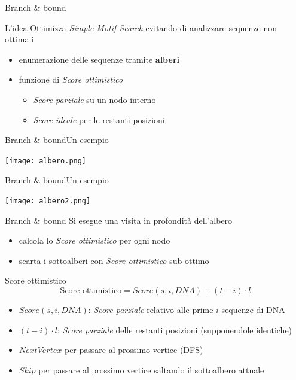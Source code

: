 	\begin{frame}{Branch \& bound}
		\begin{block}{L'idea}
			Ottimizza \textit{Simple Motif Search} evitando di analizzare sequenze non ottimali
			\begin{itemize}
				\item enumerazione delle sequenze tramite \alert{\textbf{alberi}}
				\item funzione di \textit{Score ottimistico}
				\begin{itemize}
					\item \textit{Score parziale} su un nodo interno
					\item \textit{Score ideale} per le restanti posizioni
				\end{itemize}
			\end{itemize}
		\end{block}
	\end{frame}
	
	\begin{frame}{Branch \& bound}{Un esempio}
		\begin{center}
			\texttt{[image: albero.png]}
		\end{center}
	\end{frame}
	
	\begin{frame}{Branch \& bound}{Un esempio}
		\begin{center}
			\texttt{[image: albero2.png]}
		\end{center}
	\end{frame}
	
	\begin{frame}{Branch \& bound}
		Si esegue una visita in profondità dell'albero
		\begin{itemize}
			\item calcola lo \textit{Score ottimistico} per ogni nodo
			\item scarta i sottoalberi con \textit{Score ottimistico} sub-ottimo
		\end{itemize}
		\begin{block}{Score ottimistico}
			$$\mbox{Score ottimistico}=Score(s,i,DNA)+(t-i)\cdot l$$
			\begin{itemize}
				\item $Score(s,i,DNA)$: \textit{Score parziale} relativo alle prime $i$ sequenze di DNA
				\item $(t-i)\cdot l$: \textit{Score parziale} delle restanti posizioni (supponendole identiche)
			\end{itemize}
		\end{block}
		\begin{itemize}
			\item $NextVertex$ per passare al prossimo vertice (DFS)
			\item $Skip$ per passare al prossimo vertice saltando il sottoalbero attuale
		\end{itemize}
	\end{frame}
	
